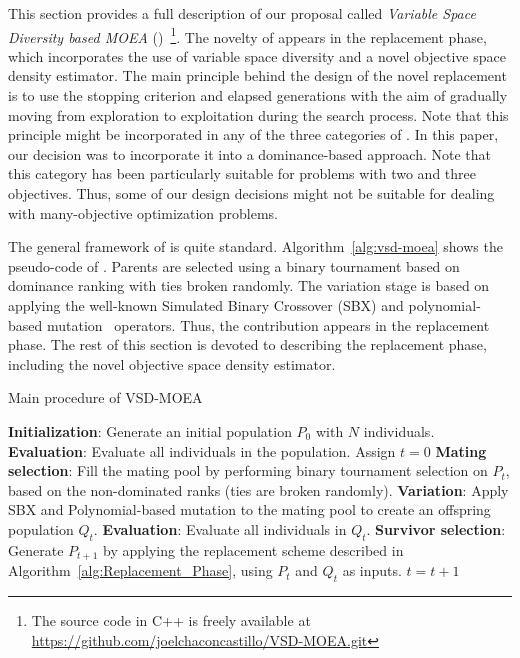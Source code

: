 
This section provides a full description of our proposal called \textit{Variable Space Diversity based MOEA} 
(\VSDMOEA{})~\footnote{The source code in C++ is freely available at \url{https://github.com/joelchaconcastillo/VSD-MOEA.git}}.
%
The novelty of \VSDMOEA{} appears in the replacement phase, which incorporates
the use of variable space diversity and a novel objective space density estimator. 
%
The main principle behind the design of the novel replacement is to use the stopping criterion and 
elapsed generations with the aim of gradually moving from exploration to exploitation during the search process.
%
Note that this principle might be incorporated in any of the three categories of \MOEAS{}.
%
In this paper, our decision was to incorporate it into a dominance-based approach.
%
Note that this category has been particularly suitable for problems with two and three objectives.
%
Thus, some of our design decisions might not be suitable for dealing with many-objective optimization problems.

The general framework of \VSDMOEA{} is quite standard.
%
Algorithm~\ref{alg:vsd-moea} shows the pseudo-code of \VSDMOEA{}.
%
Parents are selected using a binary tournament based on dominance ranking with ties broken randomly.
%
The variation stage is based on applying the well-known Simulated Binary Crossover (SBX) 
and polynomial-based mutation~\cite{Joel:SBX1994, Joel:Mutation} operators.
%
Thus, the contribution appears in the replacement phase.
%
The rest of this section is devoted to describing the replacement phase, including the novel objective space density 
estimator.

\begin{algorithm}[t]
	\caption{Main procedure of VSD-MOEA} 
	\begin{small}
\begin{algorithmic}[1]
 	\STATE \textbf{Initialization}: Generate an initial population $P_0$ with $N$ individuals.
	\STATE \textbf{Evaluation}: Evaluate all individuals in the population.
	\STATE Assign $t=0$
	   \STATE \textbf{Mating selection}: Fill the mating pool by performing binary tournament selection on $P_t$, 
		 based on the non-dominated ranks (ties are broken randomly).
	   \STATE \textbf{Variation}: Apply SBX and Polynomial-based mutation to the mating pool to create an offspring population $Q_t$.
		 \STATE \textbf{Evaluation}: Evaluate all individuals in $Q_t$.
	   \STATE \textbf{Survivor selection}: Generate $P_{t+1}$ by applying the replacement scheme 
		 described in Algorithm~\ref{alg:Replacement_Phase}, using $P_t$ and $Q_t$ as inputs.
	   \STATE $t=t+1$
	\ENDWHILE
	\end{algorithmic}
	\end{small}
\label{alg:vsd-moea}
\end{algorithm}

